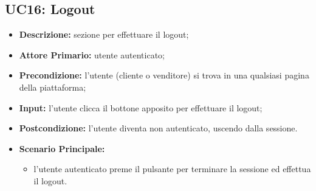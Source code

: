 \subsection{UC16: Logout}
\label{sec:UC16}
\begin{itemize}
    \item \textbf{Descrizione:} sezione per effettuare il logout;
    \item \textbf{Attore Primario:} utente autenticato;
    \item \textbf{Precondizione:} l'utente (cliente o venditore) si trova in una qualsiasi pagina della piattaforma;
    \item \textbf{Input:} l'utente clicca il bottone apposito per effettuare il logout;
    \item \textbf{Postcondizione:} l'utente diventa non autenticato, uscendo dalla sessione.
    \item \textbf{Scenario Principale:}
    \begin{itemize}
        \item l'utente autenticato preme il pulsante per terminare la sessione ed effettua il logout.
    \end{itemize}
\end{itemize}